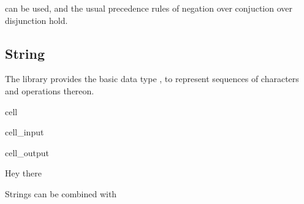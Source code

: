 \documentclass[a4paper,10pt,english]{jupyterBook}
\begin{document}
\sphinxAtStartPar
can be used, and the usual precedence rules of negation over conjuction over disjunction hold.


\subsection{String}
\label{\detokenize{text/progtut/arithmetic:string}}
\sphinxAtStartPar
The library  provides the basic data type , to represent sequences of characters and operations thereon.

\begin{sphinxuseclass}{cell}\begin{sphinxVerbatimInput}

\begin{sphinxuseclass}{cell_input}
\begin{sphinxVerbatim}[commandchars=\\\{\}]

\end{sphinxVerbatim}

\end{sphinxuseclass}\end{sphinxVerbatimInput}
\begin{sphinxVerbatimOutput}

\begin{sphinxuseclass}{cell_output}
\begin{sphinxVerbatim}[commandchars=\\\{\}]
Hey
there
\end{sphinxVerbatim}

\end{sphinxuseclass}\end{sphinxVerbatimOutput}

\end{sphinxuseclass}
\sphinxAtStartPar
Strings can be combined with \sphinxcode{\sphinxupquote{+}}
\end{document}
